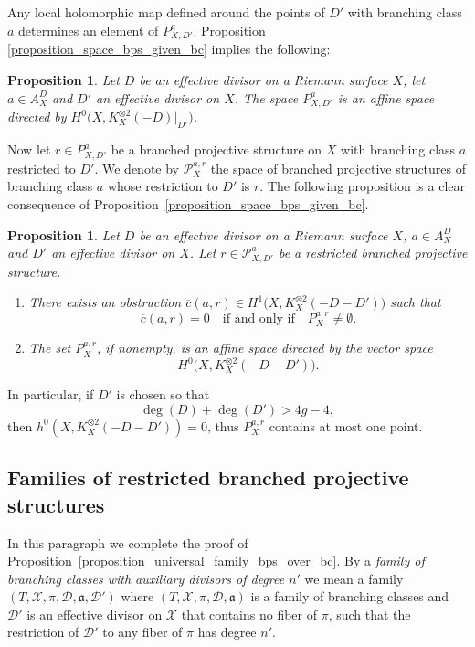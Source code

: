 \documentclass[JEP,XML,SOM,Unicode,NoEqCountersInSection,published]{cedram}
\theoremstyle{definition}
\theoremstyle{plain}
\newtheorem{proposition}[definition]{Proposition}
\begin{document}
Any local holomorphic map defined around the points of $D'$ with branching class $a$ determines an element of $P_{X, D'}^a$.
Proposition \ref{proposition_space_bps_given_bc} implies the following:

\begin{proposition}\label{prop_struct_space_jets_bps}
Let $D$ be an effective divisor on a Riemann surface $X$, let $a \in A_X^D$ and $D'$ an effective divisor on $X$.
The space $P_{X, D'}^a$ is an affine space directed by $H^0\bigl(X, K_X^{\otimes 2}(-D)|_{D'}\bigr)$.
\end{proposition}

Now let $r \in P_{X, D'}^a$ be a branched projective structure on $X$ with branching class $a$ restricted to $D'$.
We denote by $\mathcal P_X^{a, r}$ the space of branched projective structures of branching class $a$ whose restriction to $D'$ is $r$.
The following proposition is a clear consequence of Proposition~\ref{proposition_space_bps_given_bc}.

\begin{proposition}\label{proposition_space_bps_given_rbps}
Let $D$ be an effective divisor on a Riemann surface $X$, $a \in A_X^D$ and $D'$ an effective divisor on $X$.
Let $r \in \mathcal P_{X, D'}^a$ be a restricted branched projective structure.
\begin{enumerate}
\item
There exists an obstruction $\overline c(a, r) \in H^1\bigl(X, K_X^{\otimes 2}(-D-D')\bigr)$ such that
\[
\overline c(a, r)=0\quad \text{if and only if}\quad P_X^{a, r} \neq \emptyset.
\]
\item
The set $P_X^{a, r}$, if nonempty, is an affine space directed by the vector space
\[
H^0\bigl(X, K_X^{\otimes 2}(-D-D')\bigr).
\]
\end{enumerate}
\end{proposition}

In particular, if $D'$ is chosen so that
\[
\deg(D) + \deg(D') > 4g-4,
\]
then $h^0\left(X, K_X^{\otimes 2}(-D-D')\right) = 0$, thus $P_X^{a, r}$ contains at most one point.

\subsection{Families of restricted branched projective structures}\label{subsection_families_rbps}

In this paragraph we complete the proof of Proposition~\ref{proposition_universal_family_bps_over_bc}.
By a \emph{family of branching classes with auxiliary divisors of degree $n'$} we mean a family $(T, \mathcal X, \pi, \mathcal D, \mathfrak a, \mathcal D')$ where $(T, \mathcal X, \pi, \mathcal D, \mathfrak a)$ is a family of branching classes and $\mathcal D'$ is an effective divisor on $\mathcal X$ that contains no fiber of $\pi$, such that the restriction of $\mathcal D'$ to any fiber of $\pi$ has degree $n'$.
\end{document}
